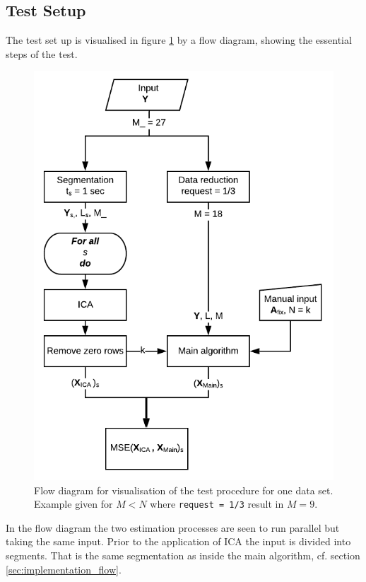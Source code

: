 \subsection{Test Setup}
The test set up is visualised in figure \ref{fig:flow2} by a flow diagram, showing the essential steps of the test. 
\begin{figure}[H]
    \centering
	\includegraphics[scale=1]{figures/ch_7/flow2.png}
	\caption{Flow diagram for visualisation of the test procedure for one data set. Example given for $M<N$ where \texttt{request = 1/3} result in $M=9$.}
	\label{fig:flow2}
\end{figure}
In the flow diagram the two estimation processes are seen to run parallel but taking the same input. 
Prior to the application of ICA the input is divided into segments. 
That is the same segmentation as inside the main algorithm, cf. section \ref{sec:implementation_flow}.
